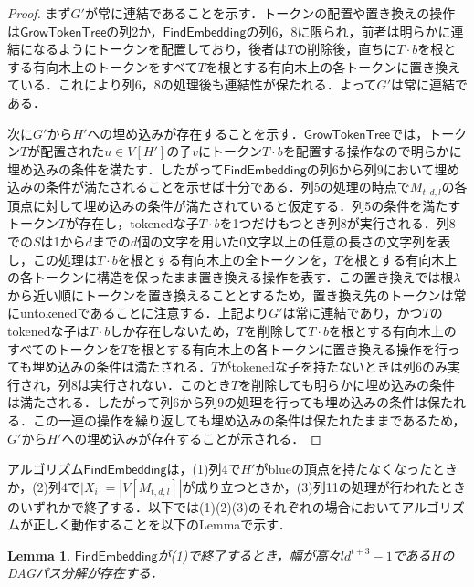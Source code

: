 \documentclass[master]{kuisthesis}		%
\theoremstyle{plain}
\newtheorem{lemma}{Lemma}
\theoremstyle{definition}
\begin{document}
\begin{proof}
    まず$G'$が常に連結であることを示す．トークンの配置や置き換えの操作は$\mathsf{GrowTokenTree}$の列2か，$\mathsf{FindEmbedding}$の列6，8に限られ，前者は明らかに連結になるようにトークンを配置しており，後者は$T$の削除後，直ちに$T\cdot b$を根とする有向木上のトークンをすべて$T$を根とする有向木上の各トークンに置き換えている．これにより列6，8の処理後も連結性が保たれる．よって$G'$は常に連結である．
    
    次に$G'$から$H'$への埋め込みが存在することを示す．$\mathsf{GrowTokenTree}$では，トークン$T$が配置された$u \in V[H']$の子$v$にトークン$T\cdot b$を配置する操作なので明らかに埋め込みの条件を満たす．したがって$\mathsf{FindEmbedding}$の列6から列9において埋め込みの条件が満たされることを示せば十分である．列5の処理の時点で$M_{t, d, l}$の各頂点に対して埋め込みの条件が満たされていると仮定する．列5の条件を満たすトークン$T$が存在し，tokenedな子$T\cdot b$を1つだけもつとき列8が実行される．列8での$S$は1から$d$までの$d$個の文字を用いた0文字以上の任意の長さの文字列を表し，この処理は$T\cdot b$を根とする有向木上の全トークンを，$T$を根とする有向木上の各トークンに構造を保ったまま置き換える操作を表す．この置き換えでは根$\lambda$から近い順にトークンを置き換えることとするため，置き換え先のトークンは常にuntokenedであることに注意する．上記より$G'$は常に連結であり，かつ$T$のtokenedな子は$T\cdot b$しか存在しないため，$T$を削除して$T\cdot b$を根とする有向木上のすべてのトークンを$T$を根とする有向木上の各トークンに置き換える操作を行っても埋め込みの条件は満たされる．$T$がtokenedな子を持たないときは列6のみ実行され，列8は実行されない．このとき$T$を削除しても明らかに埋め込みの条件は満たされる．したがって列6から列9の処理を行っても埋め込みの条件は保たれる．この一連の操作を繰り返しても埋め込みの条件は保たれたままであるため，$G'$から$H'$への埋め込みが存在することが示される．
\end{proof}

アルゴリズム$\mathsf{FindEmbedding}$は，(1)列4で$H'$がblueの頂点を持たなくなったときか，(2)列4で$|X_i| = |V[M_{t, d, l}]|$が成り立つときか，(3)列11の処理が行われたときのいずれかで終了する．以下では(1)(2)(3)のそれぞれの場合においてアルゴリズムが正しく動作することを以下のLemmaで示す．

\begin{lemma}\label{lemma_(1)}
    $\mathsf{FindEmbedding}$が(1)で終了するとき，幅が高々$ld^{t+3}-1$である$H$のDAGパス分解が存在する．
\end{lemma}
\end{document}
